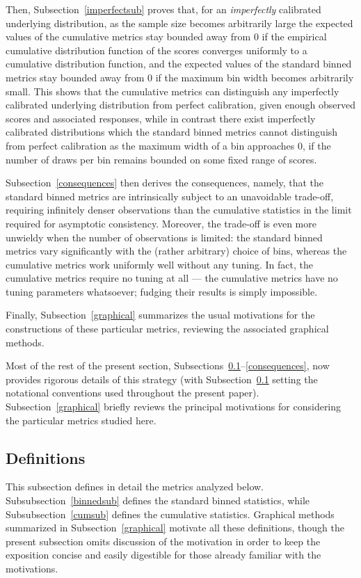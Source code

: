 \documentclass{article}
\begin{document}
Then, Subsection~\ref{imperfectsub} proves that,
for an {\it imperfectly} calibrated underlying distribution,
as the sample size becomes arbitrarily large
the expected values of the cumulative metrics stay bounded away from 0
if the empirical cumulative distribution function of the scores
converges uniformly to a cumulative distribution function,
and the expected values of the standard binned metrics stay bounded away from 0
if the maximum bin width becomes arbitrarily small.
This shows that the cumulative metrics can distinguish
any imperfectly calibrated underlying distribution from perfect calibration,
given enough observed scores and associated responses,
while in contrast there exist imperfectly calibrated distributions
which the standard binned metrics cannot distinguish
from perfect calibration as the maximum width of a bin approaches 0,
if the number of draws per bin remains bounded on some fixed range of scores.

Subsection~\ref{consequences} then derives the consequences, namely,
that the standard binned metrics are intrinsically subject
to an unavoidable trade-off, requiring infinitely denser observations
than the cumulative statistics in the limit required
for asymptotic consistency. 
Moreover, the trade-off is even more unwieldy when the number of observations
is limited: the standard binned metrics vary significantly
with the (rather arbitrary) choice of bins, whereas the cumulative metrics
work uniformly well without any tuning.
In fact, the cumulative metrics require no tuning at all ---
the cumulative metrics have no tuning parameters whatsoever;
fudging their results is simply impossible.

Finally, Subsection~\ref{graphical} summarizes the usual motivations
for the constructions of these particular metrics,
reviewing the associated graphical methods.

Most of the rest of the present section,
Subsections~\ref{defsub}--\ref{consequences},
now provides rigorous details of this strategy
(with Subsection~\ref{defsub} setting the notational conventions
used throughout the present paper).
Subsection~\ref{graphical} briefly reviews the principal motivations
for considering the particular metrics studied here.


\subsection{Definitions}
\label{defsub}

This subsection defines in detail the metrics analyzed below.
Subsubsection~\ref{binnedsub} defines the standard binned statistics,
while Subsubsection~\ref{cumsub} defines the cumulative statistics.
Graphical methods summarized in Subsection~\ref{graphical} motivate
all these definitions, though the present subsection omits discussion
of the motivation in order to keep the exposition concise and easily digestible
for those already familiar with the motivations.
\end{document}
